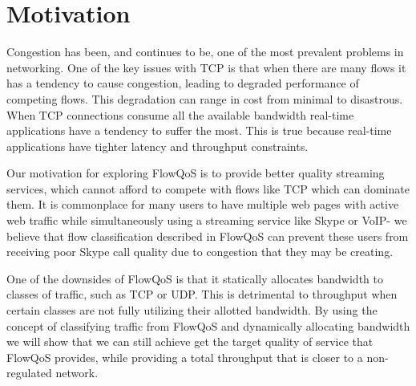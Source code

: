 \section{Motivation}
\label{sec:motivation}
Congestion has been, and continues to be, one of the most prevalent problems in networking.  One of the key issues with TCP is that when there are many flows it has a tendency to cause congestion, leading to degraded performance of competing flows.  This degradation can range in cost from minimal to disastrous.  When TCP connections consume all the available bandwidth real-time applications have a tendency to suffer the most. This is true because real-time applications have tighter latency and throughput constraints.

Our motivation for exploring FlowQoS is to provide better quality streaming services, which cannot afford to compete with flows like TCP which can dominate them.  It is commonplace for many users to have multiple web pages with active web traffic while simultaneously using a streaming service like Skype or VoIP- we believe that flow classification described in FlowQoS can prevent these users from receiving poor Skype call quality due to congestion that they may be creating.

One of the downsides of FlowQoS is that it statically allocates bandwidth to classes of traffic, such as TCP or UDP.  This is detrimental to throughput when certain classes are not fully utilizing their allotted bandwidth.  By using the concept of classifying traffic from FlowQoS and dynamically allocating bandwidth we will show that we can still achieve get the target quality of service that FlowQoS provides, while providing a total throughput that is closer to a non-regulated network.